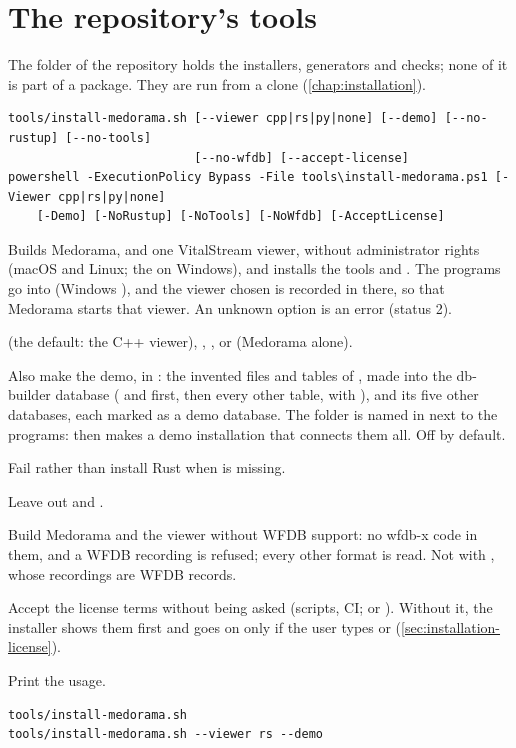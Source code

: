 \section{The repository's tools}
\label{sec:cli-tools}

The folder  of the repository holds the installers, generators and checks; none of
it is part of a package. They are run from a clone (\cref{chap:installation}).

\begin{lstlisting}[style=signature]
tools/install-medorama.sh [--viewer cpp|rs|py|none] [--demo] [--no-rustup] [--no-tools]
                          [--no-wfdb] [--accept-license]
powershell -ExecutionPolicy Bypass -File tools\install-medorama.ps1 [-Viewer cpp|rs|py|none]
    [-Demo] [-NoRustup] [-NoTools] [-NoWfdb] [-AcceptLicense]
\end{lstlisting}
Builds Medorama,  and one VitalStream viewer, without administrator rights
(macOS and Linux; the  on Windows), and installs the tools  and
. The
programs go into  (Windows ), and the viewer
chosen is recorded in  there, so that Medorama starts that viewer. An unknown
option is an error (status 2).
\begin{params}
\item[--viewer VIEWER]  (the default: the C++ viewer), , , or
   (Medorama alone).
\item[--demo] Also make the demo, in : the invented files and
  tables of , made into the db-builder database 
  ( and  first, then every other table, with
  ), and its five other databases, each marked as a
  demo database. The folder is named in  next to the programs:
   then makes a demo installation that connects them all. Off by
  default.
\item[--no-rustup] Fail rather than install Rust when  is missing.
\item[--no-tools] Leave out  and .
\item[--no-wfdb] Build Medorama and the viewer without WFDB support: no wfdb-x code in them, and
  a WFDB recording is refused; every other format is read. Not with , whose
  recordings are WFDB records.
\item[--accept-license] Accept the license terms without being asked (scripts, CI; or
  ). Without it, the installer shows them first and goes on
  only if the user types  or  (\cref{sec:installation-license}).
\item[-h, --help] Print the usage.
\end{params}
\begin{lstlisting}[style=shell]
tools/install-medorama.sh
tools/install-medorama.sh --viewer rs --demo
\end{lstlisting}

